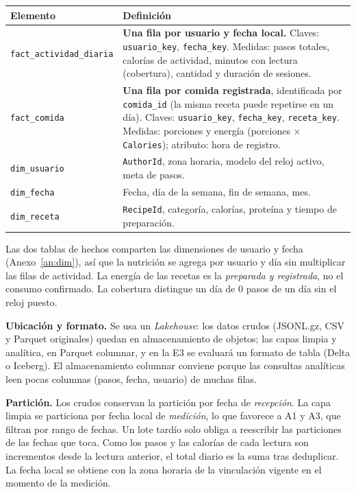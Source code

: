 \documentclass[11pt]{article}
\newcommand{\codigo}[1]{\texttt{\small #1}}
\begin{document}
{\small
\begin{tabularx}{\linewidth}{@{}p{3.6cm}X@{}}
\toprule
\textbf{Elemento} & \textbf{Definición}\\
\midrule
\codigo{fact\_actividad\_diaria} &
\textbf{Una fila por usuario y fecha local.} Claves:
\codigo{usuario\_key}, \codigo{fecha\_key}. Medidas: pasos totales,
calorías de actividad, minutos con lectura (cobertura), cantidad y
duración de sesiones.\\
\codigo{fact\_comida} &
\textbf{Una fila por comida registrada}, identificada por
\codigo{comida\_id} (la misma receta puede repetirse en un día). Claves:
\codigo{usuario\_key}, \codigo{fecha\_key}, \codigo{receta\_key}.
Medidas: porciones y energía (porciones $\times$ \codigo{Calories});
atributo: hora de registro.\\
\codigo{dim\_usuario} &
\codigo{AuthorId}, zona horaria, modelo del reloj activo, meta de pasos.\\
\codigo{dim\_fecha} &
Fecha, día de la semana, fin de semana, mes.\\
\codigo{dim\_receta} &
\codigo{RecipeId}, categoría, calorías, proteína y tiempo de preparación.\\
\bottomrule
\end{tabularx}
}

Las dos tablas de hechos comparten las dimensiones de usuario y fecha
(Anexo~\ref{an:dim}), así que la nutrición se agrega por usuario y día
sin multiplicar las filas de actividad. La energía de las recetas es
la \emph{preparada y registrada}, no el consumo confirmado. La
cobertura distingue un día de 0 pasos de un día sin el reloj puesto.

\textbf{Ubicación y formato.} Se usa un \emph{Lakehouse}: los datos
crudos (JSONL.gz, CSV y Parquet originales) quedan en almacenamiento
de objetos; las capas limpia y analítica, en Parquet columnar, y en
la E3 se evaluará un formato de tabla (Delta o Iceberg). El
almacenamiento columnar conviene porque las consultas analíticas leen
pocas columnas (pasos, fecha, usuario) de muchas filas.

\textbf{Partición.} Los crudos conservan la partición por fecha de
\emph{recepción}. La capa limpia se particiona por fecha local de
\emph{medición}, lo que favorece a A1 y A3, que filtran por rango de
fechas. Un lote tardío solo obliga a reescribir las particiones de
las fechas que toca. Como los pasos y las calorías de cada lectura son
incrementos desde la lectura anterior, el total diario es la suma tras
deduplicar. La fecha local se obtiene con la zona horaria de la
vinculación vigente en el momento de la medición.
\end{document}
